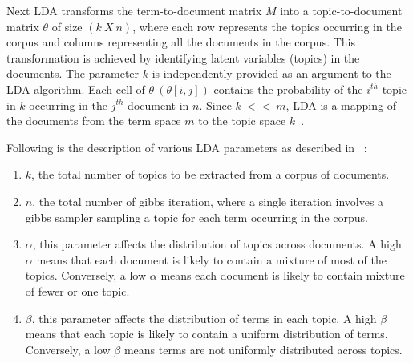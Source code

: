 Next LDA transforms the term-to-document matrix $M$ into a topic-to-document matrix $\theta$ of size $(k\ X\ n)$,
where each row represents the topics occurring in the corpus and columns representing all the documents in the corpus. 
This transformation is achieved by identifying latent variables (topics) in the documents. 
The parameter $k$ is independently provided as an argument to the LDA algorithm.
Each cell of $\theta\ (\theta[i,j])$ contains the probability of the $i^{th}$ topic in $k$ occurring in the $j^{th}$ document in $n$. Since $k\ <<\ m$, LDA is a mapping of the documents from the term space $m$ to the topic space $k$~\cite{panichella2013effectively}.

Following is the description of various LDA parameters as described in ~\cite{panichella2013effectively}:
\begin{enumerate}
	\item $k$, the total number of topics to be extracted from a corpus of documents.
	\item $n$, the total number of gibbs iteration, where a single iteration involves a gibbs sampler sampling a topic for each term occurring in the corpus.
	\item $\alpha$, this parameter affects the distribution of topics across documents. A high $\alpha$ means that each document is likely to contain a mixture of most of the topics. Conversely, a low $\alpha$ means each document is likely to contain mixture of fewer or one topic. 
	\item $\beta$, this parameter affects the distribution of terms in each topic. A high $\beta$ means that each topic is likely to contain a uniform distribution of terms. Conversely, a low $\beta$ means terms are not uniformly distributed across topics. 
	
\end{enumerate}